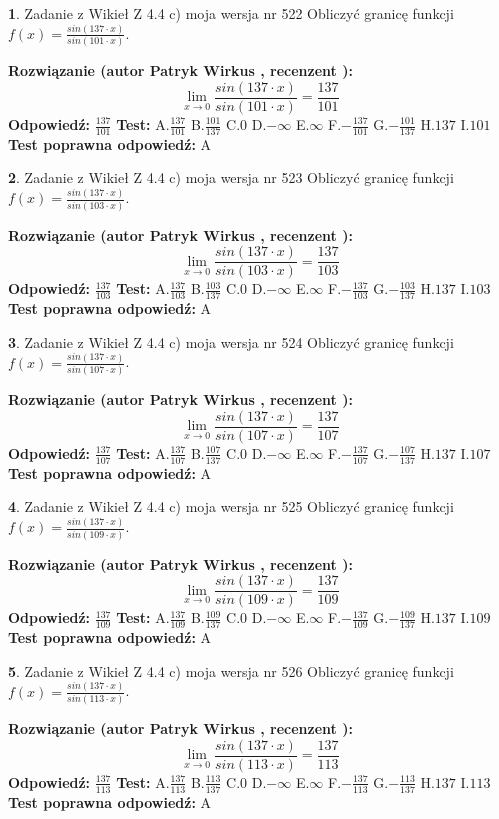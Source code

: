 \documentclass[12pt, a4paper]{article}
\theoremstyle{definition} %
\newtheorem{zad}{}
\newcommand{\zadStart}[1]{\begin{zad}#1\newline}
\newcommand{\zadStop}{\end{zad}}
\newcommand{\rozwStart}[2]{\noindent \textbf{Rozwiązanie (autor #1 , recenzent #2): }\newline}
\newcommand{\rozwStop}{\newline}
\newcommand{\odpStart}{\noindent \textbf{Odpowiedź:}\newline}
\newcommand{\odpStop}{\newline}
\newcommand{\testStart}{\noindent \textbf{Test:}\newline}
\newcommand{\testStop}{\newline}
\newcommand{\kluczStart}{\noindent \textbf{Test poprawna odpowiedź:}\newline}
\newcommand{\kluczStop}{\newline}
\begin{document}
\zadStart{Zadanie z Wikieł Z 4.4 c) moja wersja nr 522}
Obliczyć granicę funkcji $f(x)=\frac{sin(137\cdot x)}{sin(101\cdot x)}$.
\zadStop
\rozwStart{Patryk Wirkus}{}
$$\lim\limits_{x\to 0}\frac{sin(137\cdot x)}{sin(101\cdot x)}=
\frac{137}{101}$$
\rozwStop
\odpStart
$\frac{137}{101}$
\odpStop
\testStart
A.$\frac{137}{101}$
B.$\frac{101}{137}$
C.$0$
D.$-\infty$
E.$\infty$
F.$-\frac{137}{101}$
G.$-\frac{101}{137}$
H.$137$
I.$101$
\testStop
\kluczStart
A
\kluczStop



\zadStart{Zadanie z Wikieł Z 4.4 c) moja wersja nr 523}
Obliczyć granicę funkcji $f(x)=\frac{sin(137\cdot x)}{sin(103\cdot x)}$.
\zadStop
\rozwStart{Patryk Wirkus}{}
$$\lim\limits_{x\to 0}\frac{sin(137\cdot x)}{sin(103\cdot x)}=
\frac{137}{103}$$
\rozwStop
\odpStart
$\frac{137}{103}$
\odpStop
\testStart
A.$\frac{137}{103}$
B.$\frac{103}{137}$
C.$0$
D.$-\infty$
E.$\infty$
F.$-\frac{137}{103}$
G.$-\frac{103}{137}$
H.$137$
I.$103$
\testStop
\kluczStart
A
\kluczStop



\zadStart{Zadanie z Wikieł Z 4.4 c) moja wersja nr 524}
Obliczyć granicę funkcji $f(x)=\frac{sin(137\cdot x)}{sin(107\cdot x)}$.
\zadStop
\rozwStart{Patryk Wirkus}{}
$$\lim\limits_{x\to 0}\frac{sin(137\cdot x)}{sin(107\cdot x)}=
\frac{137}{107}$$
\rozwStop
\odpStart
$\frac{137}{107}$
\odpStop
\testStart
A.$\frac{137}{107}$
B.$\frac{107}{137}$
C.$0$
D.$-\infty$
E.$\infty$
F.$-\frac{137}{107}$
G.$-\frac{107}{137}$
H.$137$
I.$107$
\testStop
\kluczStart
A
\kluczStop



\zadStart{Zadanie z Wikieł Z 4.4 c) moja wersja nr 525}
Obliczyć granicę funkcji $f(x)=\frac{sin(137\cdot x)}{sin(109\cdot x)}$.
\zadStop
\rozwStart{Patryk Wirkus}{}
$$\lim\limits_{x\to 0}\frac{sin(137\cdot x)}{sin(109\cdot x)}=
\frac{137}{109}$$
\rozwStop
\odpStart
$\frac{137}{109}$
\odpStop
\testStart
A.$\frac{137}{109}$
B.$\frac{109}{137}$
C.$0$
D.$-\infty$
E.$\infty$
F.$-\frac{137}{109}$
G.$-\frac{109}{137}$
H.$137$
I.$109$
\testStop
\kluczStart
A
\kluczStop



\zadStart{Zadanie z Wikieł Z 4.4 c) moja wersja nr 526}
Obliczyć granicę funkcji $f(x)=\frac{sin(137\cdot x)}{sin(113\cdot x)}$.
\zadStop
\rozwStart{Patryk Wirkus}{}
$$\lim\limits_{x\to 0}\frac{sin(137\cdot x)}{sin(113\cdot x)}=
\frac{137}{113}$$
\rozwStop
\odpStart
$\frac{137}{113}$
\odpStop
\testStart
A.$\frac{137}{113}$
B.$\frac{113}{137}$
C.$0$
D.$-\infty$
E.$\infty$
F.$-\frac{137}{113}$
G.$-\frac{113}{137}$
H.$137$
I.$113$
\testStop
\kluczStart
A
\kluczStop
\end{document}
